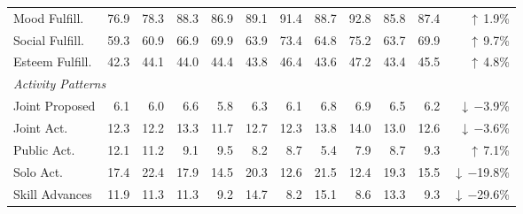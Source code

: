 \begin{table}[t]
\begin{tabular}{l rrrr rrrr rrr}
Mood Fulfill. & 76.9 & 78.3 & 88.3 & 86.9 & 89.1 & 91.4 & 88.7 & 92.8 & 85.8 & 87.4 & $\uparrow$\,1.9\% \\
Social Fulfill. & 59.3 & 60.9 & 66.9 & 69.9 & 63.9 & 73.4 & 64.8 & 75.2 & 63.7 & 69.9 & $\uparrow$\,9.7\% \\
Esteem Fulfill. & 42.3 & 44.1 & 44.0 & 44.4 & 43.8 & 46.4 & 43.6 & 47.2 & 43.4 & 45.5 & $\uparrow$\,4.8\% \\
\midrule
\multicolumn{12}{l}{\textit{Activity Patterns}} \\
Joint Proposed & 6.1 & 6.0 & 6.6 & 5.8 & 6.3 & 6.1 & 6.8 & 6.9 & 6.5 & 6.2 & $\downarrow$\,$-$3.9\% \\
Joint Act. & 12.3 & 12.2 & 13.3 & 11.7 & 12.7 & 12.3 & 13.8 & 14.0 & 13.0 & 12.6 & $\downarrow$\,$-$3.6\% \\
Public Act. & 12.1 & 11.2 & 9.1 & 9.5 & 8.2 & 8.7 & 5.4 & 7.9 & 8.7 & 9.3 & $\uparrow$\,7.1\% \\
Solo Act. & 17.4 & 22.4 & 17.9 & 14.5 & 20.3 & 12.6 & 21.5 & 12.4 & 19.3 & 15.5 & $\downarrow$\,$-$19.8\% \\
Skill Advances & 11.9 & 11.3 & 11.3 & 9.2 & 14.7 & 8.2 & 15.1 & 8.6 & 13.3 & 9.3 & $\downarrow$\,$-$29.6\% \\
\bottomrule
\end{tabular}
\end{table}

